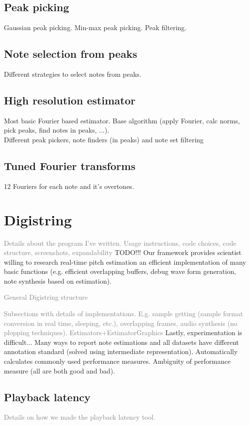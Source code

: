 \documentclass[10pt,twocolumn]{article}
\begin{document}
\subsection{Peak picking}
Gaussian peak picking. Min-max peak picking. Peak filtering.

\subsection{Note selection from peaks}
Different strategies to select notes from peaks.

\subsection{High resolution estimator}
Most basic Fourier based estimator. Base algorithm (apply Fourier, calc norms, pick peaks, find notes in peaks, ...).\\
Different peak pickers, note finders (in peaks) and note set filtering

\subsection{Tuned Fourier transforms}
12 Fouriers for each note and it's overtones.


\section{Digistring}
\textcolor{gray}{Details about the program I've written. Usage instructions, code choices, code structure, screenshots, expandability}
TODO!!! Our framework provides scientist willing to research real-time pitch estimation an efficient implementation of many basic functions (e.g. efficient overlapping buffers, debug wave form generation, note synthesis based on estimation).

\textcolor{gray}{General Digistring structure}

\textcolor{gray}{Subsections with details of implementations. E.g. sample getting (sample format conversion in real time, sleeping, etc.), overlapping frames, audio synthesis (no plopping techniques), Estimators+EstimatorGraphics}
Lastly, experimentation is difficult... Many ways to report note estimations and all datasets have different annotation standard (solved using intermediate representation). Automatically calculates commonly used performance measures. Ambiguity of performance measure (all are both good and bad).

\subsection{Playback latency}  \label{sub:playback_latency}
\textcolor{gray}{Details on how we made the playback latency tool.}
\end{document}

